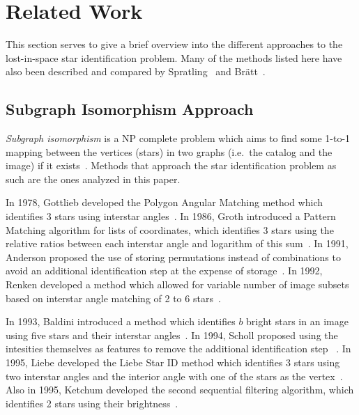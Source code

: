 \section{Related Work}\label{sec:relatedWork}
This section serves to give a brief overview into the different approaches to the lost-in-space star identification
problem.
Many of the methods listed here have also been described and compared by
Spratling~\cite{spratling:surveyStarIdentification} and Br\"{a}tt~\cite{bratt:analysisStarIdentification}.

\subsection{Subgraph Isomorphism Approach}\label{subsec:subgraphIsomorphismApproach}
\textit{Subgraph isomorphism} is a NP complete problem which aims to find some 1-to-1 mapping between the vertices
(stars) in two graphs (i.e.\ the catalog and the image) if it exists~\cite{scott:graphIsomorphismProblem}.
Methods that approach the star identification problem as such are the ones analyzed in this paper.

In 1978, Gottlieb developed the Polygon Angular Matching method which identifies 3 stars using interstar
angles~\cite{gottlieb:spacecraftAttitudeDetermination}.
In 1986, Groth introduced a Pattern Matching algorithm for lists of coordinates, which identifies 3 stars using the
relative ratios between each interstar angle and logarithm of this sum~\cite{groth:patternMatchingMethod}.
In 1991, Anderson proposed the use of storing permutations instead of combinations to avoid an additional
identification step at the expense of storage~\cite{spratling:surveyStarIdentification,anderson:autonomousStarSensing}.
In 1992, Renken developed a method which allowed for variable number of image subsets based on interstar angle matching
of 2 to 6 stars~\cite{bratt:analysisStarIdentification,renken:starConstellationMatching}.

In 1993, Baldini introduced a method which identifies $b$ bright stars in an image using five stars and their interstar
angles~\cite{spratling:surveyStarIdentification,baldini:starConstellationMatching}.
In 1994, Scholl proposed using the intesities themselves as features to remove the additional identification step
~\cite{spratling:surveyStarIdentification,scholl:starFieldIdentification}.
In 1995, Liebe developed the Liebe Star ID method which identifies 3 stars using two interstar angles and the
interior angle with one of the stars as the vertex~\cite{liebe:starTrackersAttitudeDetermination}.
Also in 1995, Ketchum developed the second sequential filtering algorithm, which identifies 2 stars using their
brightness~\cite{spratling:surveyStarIdentification,ketchum:onboardStarIdentification}.

